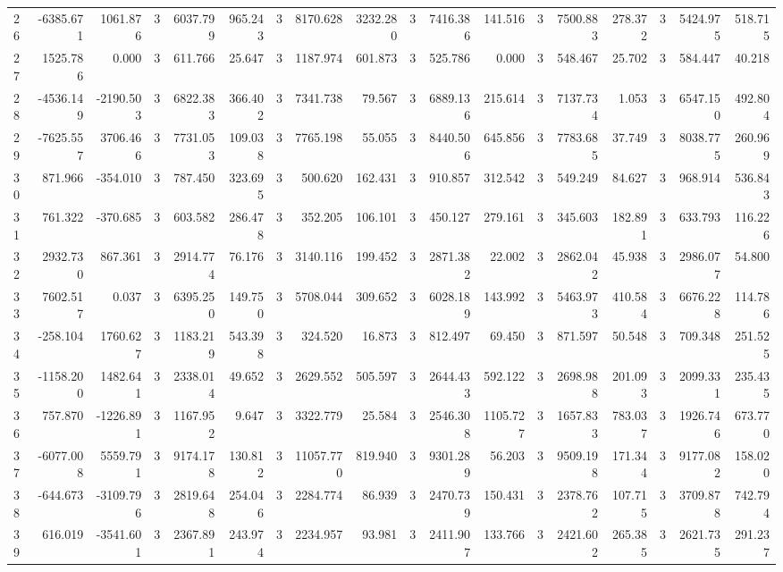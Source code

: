 \begin{table}[ht]
\begin{tabular}{lrrrrrrrrrrrrrrrrr}
26 & -6385.671 & 1061.876 & 3 & 6037.799 & 965.243 & 3 & 8170.628 & 3232.280 & 3 & 7416.386 & 141.516 & 3 & 7500.883 & 278.372 & 3 & 5424.975 & 518.715 \\
27 & 1525.786 & 0.000 & 3 & 611.766 & 25.647 & 3 & 1187.974 & 601.873 & 3 & 525.786 & 0.000 & 3 & 548.467 & 25.702 & 3 & 584.447 & 40.218 \\
28 & -4536.149 & -2190.503 & 3 & 6822.383 & 366.402 & 3 & 7341.738 & 79.567 & 3 & 6889.136 & 215.614 & 3 & 7137.734 & 1.053 & 3 & 6547.150 & 492.804 \\
29 & -7625.557 & 3706.466 & 3 & 7731.053 & 109.038 & 3 & 7765.198 & 55.055 & 3 & 8440.506 & 645.856 & 3 & 7783.685 & 37.749 & 3 & 8038.775 & 260.969 \\
30 & 871.966 & -354.010 & 3 & 787.450 & 323.695 & 3 & 500.620 & 162.431 & 3 & 910.857 & 312.542 & 3 & 549.249 & 84.627 & 3 & 968.914 & 536.843 \\
31 & 761.322 & -370.685 & 3 & 603.582 & 286.478 & 3 & 352.205 & 106.101 & 3 & 450.127 & 279.161 & 3 & 345.603 & 182.891 & 3 & 633.793 & 116.226 \\
32 & 2932.730 & 867.361 & 3 & 2914.774 & 76.176 & 3 & 3140.116 & 199.452 & 3 & 2871.382 & 22.002 & 3 & 2862.042 & 45.938 & 3 & 2986.077 & 54.800 \\
33 & 7602.517 & 0.037 & 3 & 6395.250 & 149.750 & 3 & 5708.044 & 309.652 & 3 & 6028.189 & 143.992 & 3 & 5463.973 & 410.584 & 3 & 6676.228 & 114.786 \\
34 & -258.104 & 1760.627 & 3 & 1183.219 & 543.398 & 3 & 324.520 & 16.873 & 3 & 812.497 & 69.450 & 3 & 871.597 & 50.548 & 3 & 709.348 & 251.525 \\
35 & -1158.200 & 1482.641 & 3 & 2338.014 & 49.652 & 3 & 2629.552 & 505.597 & 3 & 2644.433 & 592.122 & 3 & 2698.988 & 201.093 & 3 & 2099.331 & 235.435 \\
36 & 757.870 & -1226.891 & 3 & 1167.952 & 9.647 & 3 & 3322.779 & 25.584 & 3 & 2546.308 & 1105.727 & 3 & 1657.833 & 783.037 & 3 & 1926.746 & 673.770 \\
37 & -6077.008 & 5559.791 & 3 & 9174.178 & 130.812 & 3 & 11057.770 & 819.940 & 3 & 9301.289 & 56.203 & 3 & 9509.198 & 171.344 & 3 & 9177.082 & 158.020 \\
38 & -644.673 & -3109.796 & 3 & 2819.648 & 254.046 & 3 & 2284.774 & 86.939 & 3 & 2470.739 & 150.431 & 3 & 2378.762 & 107.715 & 3 & 3709.878 & 742.794 \\
39 & 616.019 & -3541.601 & 3 & 2367.891 & 243.974 & 3 & 2234.957 & 93.981 & 3 & 2411.907 & 133.766 & 3 & 2421.602 & 265.385 & 3 & 2621.735 & 291.237 \\

\end{tabular}
\end{table}
